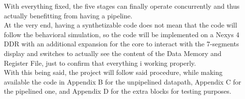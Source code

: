 With everything fixed, the five stages can finally operate concurrently and thus actually benefitting from having a pipeline.\\
At the very end, having a synthetizable code does not mean that the code will follow the behavioral simulation, so the code will be implemented on a Nexys 4 DDR with an additional expansion for the core to interact with the 7-segments display and switches to actually see the content of the Data Memory and Register File, just to confirm that everything i working properly.\\
With this being said, the project will follow said procedure, while making available the code in Appendix B for the unpipelined datapath, Appendix C for the pipelined one, and Appendix D for the extra blocks for testing purposes.
